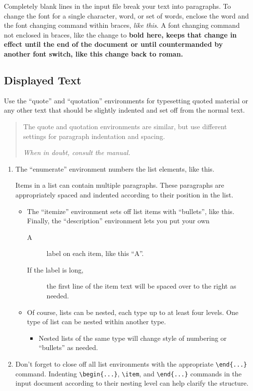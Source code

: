 \documentclass[11pt,oneside]{book}
\begin{document}
Completely blank lines in the input file break your text into
paragraphs.
To change the font for a single character, word, or set of words, 
enclose the word and the font changing command within braces, 
{\em like this}.
A font changing command not enclosed in braces, like the change to \bf 
bold here, keeps that change in effect until the end of the document or
until countermanded by another font switch, like this change back to 
\rm roman.

\subsection {Displayed Text}
Use the ``quote'' and  ``quotation'' environments for typesetting quoted
material or any other text that should be slightly indented and set off
from the normal text.
\begin{quotation}
The quote and quotation environments are similar, but use different 
settings for paragraph indentation and spacing.

\em When in doubt, consult the manual.
\end{quotation}


\begin{enumerate}
\item 
The ``enumerate'' environment numbers the list elements, like this.

Items in a list can contain multiple paragraphs.
These paragraphs are appropriately spaced and indented according to their
position in the list.
   \begin{itemize}
   \item The ``itemize'' environment sets off list items with ``bullets'',
like this.  Finally, the ``description'' environment lets you put your own
      \begin{description}
      \item[A] label on each item, like this ``A''.
      \item[If the label is long,] the first line of the item text will
be spaced over to the right as needed.
      \end{description}
   \item Of course, lists can be nested, each type up to at least four levels.
One type of list can be nested within another type.
      \begin{itemize}
      \item Nested lists of the same type will change style of numbering 
or ``bullets'' as needed.
      \end{itemize}
   \end{itemize}
\item Don't forget to close off all list environments with the 
appropriate \verb+\end{...}+ command.
Indenting \verb+\begin{...}+, \verb+\item+, and \verb+\end{...}+
commands in the input document according to their nesting level can help 
clarify the structure.
\end{enumerate}
\end{document}
